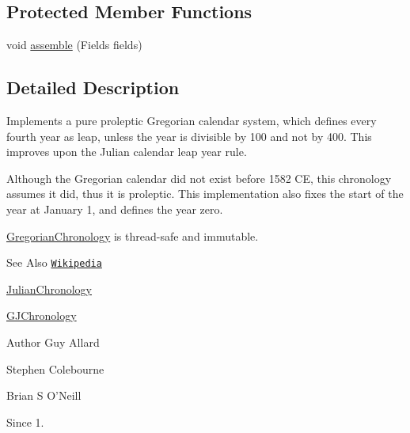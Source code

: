 \subsection*{Protected Member Functions}
\begin{DoxyCompactItemize}
\item 
void \hyperlink{classorg_1_1joda_1_1time_1_1chrono_1_1_gregorian_chronology_a45b1e30863e8424561cff1df40134dd6}{assemble} (Fields fields)
\end{DoxyCompactItemize}


\subsection{Detailed Description}
Implements a pure proleptic Gregorian calendar system, which defines every fourth year as leap, unless the year is divisible by 100 and not by 400. This improves upon the Julian calendar leap year rule. 

Although the Gregorian calendar did not exist before 1582 C\-E, this chronology assumes it did, thus it is proleptic. This implementation also fixes the start of the year at January 1, and defines the year zero. 

\hyperlink{classorg_1_1joda_1_1time_1_1chrono_1_1_gregorian_chronology}{Gregorian\-Chronology} is thread-\/safe and immutable.

\begin{DoxySeeAlso}{See Also}
\href{http://en.wikipedia.org/wiki/Gregorian_calendar}{\tt Wikipedia} 

\hyperlink{classorg_1_1joda_1_1time_1_1chrono_1_1_julian_chronology}{Julian\-Chronology} 

\hyperlink{classorg_1_1joda_1_1time_1_1chrono_1_1_g_j_chronology}{G\-J\-Chronology}
\end{DoxySeeAlso}
\begin{DoxyAuthor}{Author}
Guy Allard 

Stephen Colebourne 

Brian S O'Neill 
\end{DoxyAuthor}
\begin{DoxySince}{Since}
1. 
\end{DoxySince}


